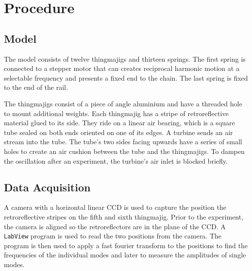 \chapter{Procedure}
\section{Model}
The model consists of twelve thingmajigs and thirteen springs.
The first spring is connected to a stepper motor that can creates reciprocal harmonic motion at a selectable frequency and presents a fixed end to the chain.
The last spring is fixed to the end of the rail.

The thingmajigs consist of a piece of angle aluminium and have a threaded hole to mount additional weights.
Each thingmajig has a stripe of retroreflective material glued to its side.
They ride on a linear air bearing, which is a square tube sealed on both ends oriented on one of its edges.
A turbine sends an air stream into the tube.
The tube's two sides facing upwards have a series of small holes to create an air cushion between the tube and the thingmajigs.
To dampen the oscillation after an experiment, the turbine's air inlet is blocked briefly.

\section{Data Acquisition}\label{sec:data_acq}
A camera with a horizontal linear CCD is used to capture the position the retroreflective stripes on the fifth and sixth thingmajig.
Prior to the experiment, the camera is aligned so the retroreflectors are in the plane of the CCD.
A \texttt{LabView} program is used to read the two positions from the camera.
The program is then used to apply a fast fourier transform to the positions to find the frequencies of the individual modes and later to measure the amplitudes of single modes.
